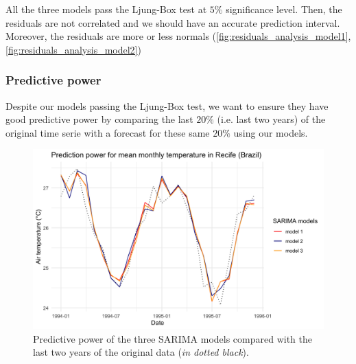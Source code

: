 All the three models pass the Ljung-Box test at $5\%$ significance level. Then, the residuals are not correlated and we should have an accurate prediction interval. Moreover, the residuals are more or less normals (\autoref{fig:residuals_analysis_model1}, \autoref{fig:residuals_analysis_model2})

\subsubsection{Predictive power}

Despite our models passing the Ljung-Box test, we want to ensure they have good predictive power by comparing the last $20\%$ (i.e. last two years) of the original time serie with a forecast for these same $20\%$ using our models.

\begin{figure}[H]
	\centering
	\includegraphics{figures/box_jenkins/predictive_power.png}
	\caption{Predictive power of the three SARIMA models compared with the last two years of the original data (\textit{in dotted black}).}
	\label{fig:predictive-power}
\end{figure}